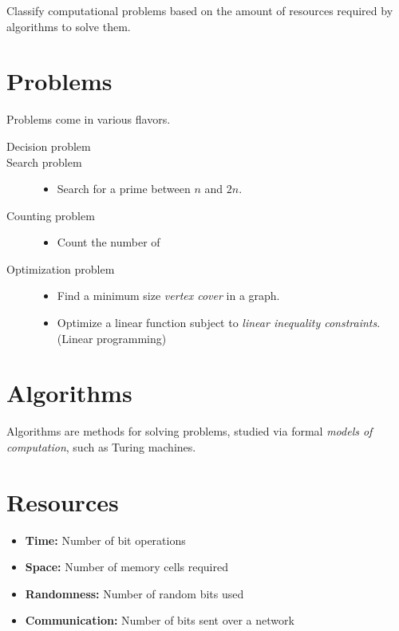 \begin{center}
    Classify computational problems based on the amount of resources
    required by algorithms to solve them.
\end{center}

\section*{Problems}
Problems come in various flavors.
\begin{description}
    \item[Decision problem] \leavevmode
    \item[Search problem] \leavevmode
        \begin{itemize}
            \item Search for a prime between $n$ and $2n$.
        \end{itemize}
    \item[Counting problem] \leavevmode
        \begin{itemize}
            \item Count the number of 
        \end{itemize}
    \item[Optimization problem] \leavevmode
        \begin{itemize}
            \item Find a minimum size \emph{vertex cover} in a graph.
            \item Optimize a linear function subject to \emph{linear
            inequality constraints}. (Linear programming)
        \end{itemize}
\end{description}

\section*{Algorithms}
Algorithms are methods for solving problems, studied via formal
\emph{models of computation}, such as Turing machines.

\section*{Resources}
\begin{itemize}
    \item \textbf{Time:} Number of bit operations
    \item \textbf{Space:} Number of memory cells required
    \item \textbf{Randomness:} Number of random bits used
    \item \textbf{Communication:} Number of bits sent over a network
\end{itemize}

